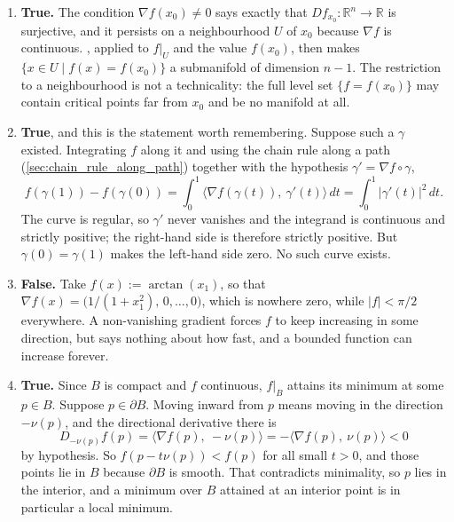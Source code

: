 \begin{exercisesolution}
\label{sol:gradient_field_four_verdicts}
\begin{enumerate}[label=\textbf{(\alph*)}]
  \item \textbf{True.} The condition $\nabla f(x_0) \neq 0$ says exactly that
    $Df_{x_0} : \mathbb{R}^n \to \mathbb{R}$ is surjective, and it persists on a neighbourhood
    $U$ of $x_0$ because $\nabla f$ is continuous. , applied to
    $f|_U$ and the value $f(x_0)$, then makes $\{x \in U \mid f(x) = f(x_0)\}$ a submanifold of
    dimension $n-1$. The restriction to a neighbourhood is not a technicality: the full level set
    $\{f = f(x_0)\}$ may contain critical points far from $x_0$ and be no manifold at all.
  \item \textbf{True}, and this is the statement worth remembering. Suppose such a $\gamma$
    existed. Integrating $f$ along it and using the chain rule along a path
    (\cref{sec:chain_rule_along_path}) together with the hypothesis $\gamma' = \nabla f\circ
    \gamma$,
    \[f(\gamma(1)) - f(\gamma(0)) = \int_0^1 \big\langle\nabla f(\gamma(t)),\ \gamma'(t)\big\rangle\,dt
      = \int_0^1 \lvert\gamma'(t)\rvert^2\,dt .\]
    The curve is regular, so $\gamma'$ never vanishes and the integrand is continuous and
    strictly positive; the right-hand side is therefore strictly positive. But $\gamma(0) =
    \gamma(1)$ makes the left-hand side zero. No such curve exists.
  \item \textbf{False.} Take $f(x) := \arctan(x_1)$, so that
    $\nabla f(x) = \big(1/(1+x_1^2),\,0,\dots,0\big)$, which is nowhere zero, while
    $\lvert f\rvert < \pi/2$ everywhere. A non-vanishing gradient forces $f$ to keep increasing
    in some direction, but says nothing about how fast, and a bounded function can increase
    forever.
  \item \textbf{True.} Since $B$ is compact and $f$ continuous, $f|_B$ attains its minimum at
    some $p \in B$. Suppose $p \in \partial B$. Moving inward from $p$ means moving in the
    direction $-\nu(p)$, and the directional derivative there is
    \[D_{-\nu(p)}f(p) = \big\langle\nabla f(p),\ -\nu(p)\big\rangle
      = -\big\langle\nabla f(p),\ \nu(p)\big\rangle < 0\]
    by hypothesis. So $f(p - t\nu(p)) < f(p)$ for all small $t > 0$, and those points lie in $B$
    because $\partial B$ is smooth. That contradicts minimality, so $p$ lies in the interior, and
    a minimum over $B$ attained at an interior point is in particular a local minimum.
\end{enumerate}


\end{exercisesolution}
